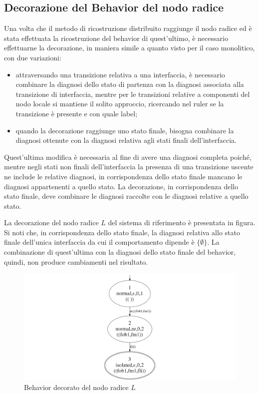 \subsection{Decorazione del Behavior del nodo radice}
Una volta che il metodo di ricostruzione distribuito raggiunge il nodo radice ed è stata effettuata la ricostruzione del behavior di quest'ultimo, è necessario effettuarne la decorazione, in maniera simile a quanto visto per il caso monolitico, con due variazioni:
\begin{itemize}
\item attraversando una transizione relativa a una interfaccia, è necessario combinare la diagnosi dello stato di partenza con la diagnosi associata alla transizione di interfaccia, mentre per le transizioni relative a componenti del nodo locale si mantiene il solito approccio, ricercando nel ruler se la transizione è presente e con quale label;
\item quando la decorazione raggiunge uno stato finale, bisogna combinare la diagnosi ottenute con la diagnosi relativa agli stati finali dell'interfaccia.
\end{itemize}
Quest'ultima modifica è necessaria al fine di avere una diagnosi completa poiché, mentre negli stati non finali dell'interfaccia la presenza di una transizione uscente ne include le relative diagnosi, in corrispondenza dello stato finale mancano le diagnosi appartenenti a quello stato. La decorazione, in corrispondenza dello stato finale, deve combinare le diagnosi raccolte con le diagnosi relative a quello stato.

\begin{ex}
La decorazione del nodo radice $L$ del sistema di riferimento è presentata in figura. Si noti che, in corrispondenza dello stato finale, la diagnosi relativa allo stato finale dell'unica interfaccia da cui il comportamento dipende è $\{\emptyset\}$. La combinazione di quest'ultima con la diagnosi dello stato finale del behavior, quindi, non produce cambiamenti nel risultato. 
\end{ex}

\begin{figure}[htbp]
\centering
\includegraphics[scale=0.2]{./Img/sac/bhv_l.png}
\caption{Behavior decorato del nodo radice $L$}
\label{fig:bhv_l}
\end{figure}
